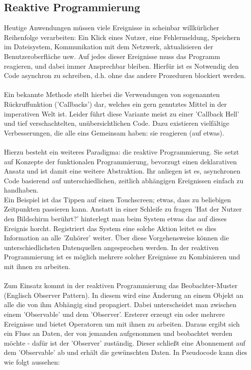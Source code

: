 \subsection{Reaktive Programmierung}
\label{subsec:reaktive-programmierung}
Heutige Anwendungen müssen viele Ereignisse in scheinbar willkürlicher Reihenfolge verarbeiten: Ein Klick eines Nutzer, eine Fehlermeldung, Speichern im Dateisystem, Kommunikation mit dem Netzwerk, aktualisieren der Benutzeroberfläche usw. Auf jedes dieser Ereignisse muss das Programm reagieren, und dabei immer Ansprechbar bleiben. Hierfür ist es Notwendig den Code asynchron zu schreiben, d.h. ohne das andere Prozeduren blockiert werden.
\\\\
Ein bekannte Methode stellt hierbei die Verwendungen von sogenannten Rückruffunktion ('Callbacks') dar, welches ein gern genutztes Mittel in der imperativen Welt ist. Leider führt diese Variante meist zu einer 'Callback Hell' und tief verschachtelten, unübersichtlichen Code. Dazu existieren vielfältige Verbesserungen, die alle eins Gemeinsam haben: sie reagieren (auf etwas).
\\\\
Hierzu besteht ein weiteres Paradigma: die reaktive Programmierung. Sie setzt auf Konzepte der funktionalen Programmierung, bevorzugt einen deklarativen Ansatz und ist damit eine weitere Abstraktion. Ihr anliegen ist es, asynchronen Code basierend auf unterschiedlichen, zeitlich abhängigen Ereignissen einfach zu handhaben.
\\
Ein Beispiel ist das Tippen auf einen Touchscreen; etwas, dass zu beliebigen Zeitpunkten passieren kann. Anstatt in einer Schleife zu fragen 'Hat der Nutzer den Bildschirm berührt?' hinterlegt man beim System etwas das auf dieses Ereignis horcht. Registriert das System eine solche Aktion leitet es dies Information an alle 'Zuhörer' weiter. Über diese Vorgehensweise können die unterschiedlichsten Datenquellen angesprochen werden. In der reaktiven Programmierung ist es möglich mehrere solcher Ereignisse zu Kombinieren und mit ihnen zu arbeiten.
\\\\
Zum Einsatz kommt in der reaktiven Programmierung das Beobachter-Muster (Englisch Observer Pattern). In diesem wird eine Änderung an einem Objekt an alle die von ihm Abhängig sind propagiert. Dabei unterscheidet man zwischen einem 'Observable' und dem 'Observer'. Ersterer erzeugt ein oder mehrere Ereignisse und bietet Operatoren um mit ihnen zu arbeiten. Daraus ergibt sich ein Fluss an Daten, der von jemanden aufgenommen und beobachtet werden möchte - dafür ist der 'Observer' zuständig. Dieser schließt eine Abonnement auf dem 'Observable' ab und erhält die gewünschten Daten. In Pseudocode kann dies wie folgt aussehen:
